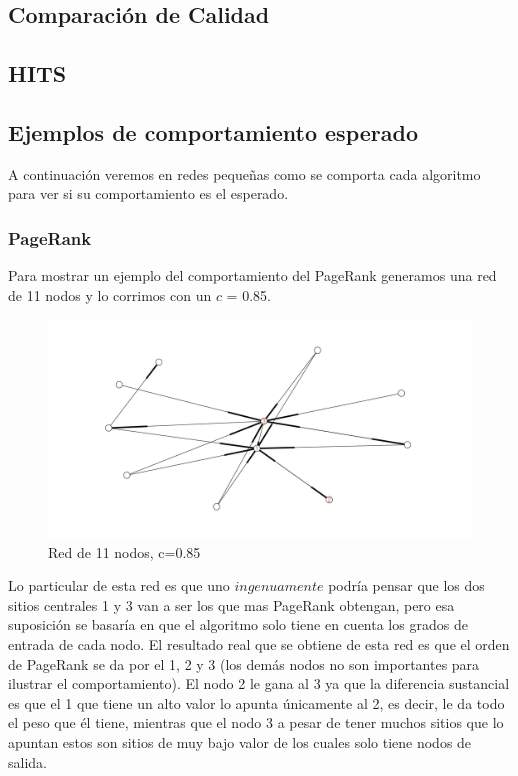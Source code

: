\subsection{Comparación de Calidad}

\subsection{HITS}


\subsection{Ejemplos de comportamiento esperado}

A continuación veremos en redes pequeñas como se comporta cada algoritmo para ver si su comportamiento es el esperado.

\subsubsection{PageRank}
Para mostrar un ejemplo del comportamiento del PageRank generamos una red de 11 nodos y lo corrimos con un $c$ = 0.85.

 \begin{figure}[!htb]
\begin{center}
    \includegraphics[scale=0.5]{imagenes/test5.png}
    \caption{Red de 11 nodos, c=0.85}
    \end{center}
\end{figure}

Lo particular de esta red es que uno $ingenuamente$ podría pensar que los dos sitios centrales 1 y 3 van a ser los que mas PageRank obtengan, pero esa suposición se basaría en que el algoritmo solo tiene en cuenta los grados de entrada de cada nodo. 
El resultado real que se obtiene de esta red es que el orden de PageRank se da por el 1, 2 y 3 (los demás nodos no son importantes para ilustrar el comportamiento). El nodo 2 le gana al 3 ya que la diferencia sustancial es que el 1 que tiene un alto valor lo apunta únicamente al 2, es decir, le da todo el peso que él tiene, mientras que el nodo 3 a pesar de tener muchos sitios que lo apuntan estos son sitios de muy bajo valor de los cuales solo tiene nodos de salida.


